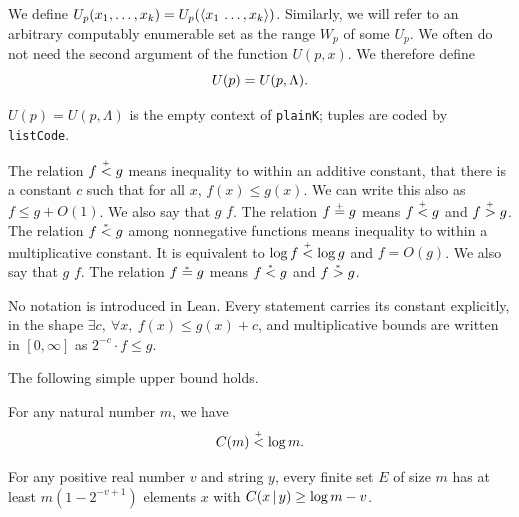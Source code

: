  \begin{definition}
  \label{def:tuples}
  \leanok
We define \( U_{p}(x_{1},\ldots,x_{k}) = U_{p}({\mathopen\langle  x_{1}\,\ldots, x_{k}\mathclose\rangle}) \). 
Similarly,
we will refer to an arbitrary computably enumerable
set as the range \( W_{p} \) of some \( U_{p} \).  
We often do not need the second argument of the function \( U(p,x) \).  
We therefore define 
 \[ U(p) = U(p,\Lambda).
 \]
 \end{definition}
\begin{formalization}
$U(p) = U(p,\Lambda)$ is the empty context of \texttt{plainK}; tuples are coded by \texttt{listCode}.
\end{formalization}


 \begin{definition}
  \label{def:additive-order}
  \leanok
The relation 
\( f \stackrel{{}_+}{<} g \) means inequality to within an additive constant, that
there is a constant \( c \) such that for all \( x \), \( f(x) \le g(x) \). 
We can write this also as \( f \le g + O(1) \). 
We also say that \( g \)  \( f \). 
The relation \( f \stackrel{{}_+}{=} g \) means \( f \stackrel{{}_+}{<} g \)
and \( f \stackrel{{}_+}{>} g \). 
The relation \( f \stackrel{{}_*}{<} g \) among nonnegative functions
means inequality to within a multiplicative constant. 
It is
equivalent to \( \log f \stackrel{{}_+}{<} \log g \) and \( f = O(g) \). 
We also say that
\( g \)  \( f \). 
The relation \( f\stackrel{{}_*}{=} g \) means \( f \stackrel{{}_*}{<} g \) and \( f \stackrel{{}_*}{>} g \).
 \end{definition}
\begin{formalization}
No notation is introduced in Lean. Every statement carries its constant explicitly, in the shape $\exists c,\ \forall x,\ f(x) \le g(x) + c$, and multiplicative bounds are written in $[0,\infty]$ as $2^{-c} \cdot f \le g$.
\end{formalization}


\begin{theorem}
  \leanok
   \label{thm:upbd}
The following simple upper bound holds.
 \begin{alphenum}  
  \item \label{thebd} For any natural number \( m \), we have 
 \setcounter{equation}{2}%
 \begin{equation} C(m) \stackrel{{}_+}{<} \log m. \label{eq:upbd}
 \end{equation}
 \item \label{howsharp}
  For any positive real number \( v \) and string \( y \), every finite set 
	\( E \) of size \( m \) has at least \( m(1-2^{-v+1}) \) elements \( x \) with 
	\( C(x \,\vert\, y) \ge \log m - v  \).
 \end{alphenum}
\end{theorem}

